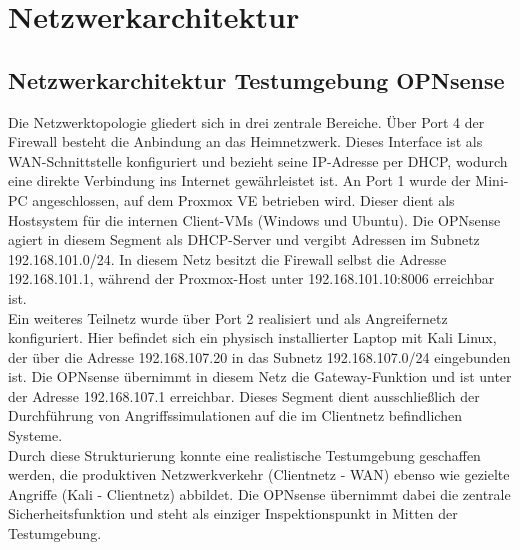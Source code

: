 \section{Netzwerkarchitektur}
\subsection{Netzwerkarchitektur Testumgebung OPNsense}
Die Netzwerktopologie gliedert sich in drei zentrale Bereiche. Über Port 4 der Firewall besteht die Anbindung an das Heimnetzwerk. Dieses Interface ist als WAN-Schnittstelle konfiguriert und bezieht seine IP-Adresse per DHCP, wodurch eine direkte Verbindung ins Internet gewährleistet ist. An Port 1 wurde der Mini-PC angeschlossen, auf dem Proxmox VE betrieben wird. Dieser dient als Hostsystem für die internen Client-VMs (Windows und Ubuntu). Die OPNsense agiert in diesem Segment als DHCP-Server und vergibt Adressen im Subnetz 192.168.101.0/24. In diesem Netz besitzt die Firewall selbst die Adresse 192.168.101.1, während der Proxmox-Host unter 192.168.101.10:8006 erreichbar ist.\\
Ein weiteres Teilnetz wurde über Port 2 realisiert und als Angreifernetz konfiguriert. Hier befindet sich ein physisch installierter Laptop mit Kali Linux, der über die Adresse 192.168.107.20 in das Subnetz 192.168.107.0/24 eingebunden ist. Die OPNsense übernimmt in diesem Netz die Gateway-Funktion und ist unter der Adresse 192.168.107.1 erreichbar. Dieses Segment dient ausschließlich der Durchführung von Angriffssimulationen auf die im Clientnetz befindlichen Systeme.\\
Durch diese Strukturierung konnte eine realistische Testumgebung geschaffen werden, die produktiven Netzwerkverkehr (Clientnetz - WAN) ebenso wie gezielte Angriffe (Kali - Clientnetz) abbildet. Die OPNsense übernimmt dabei die zentrale Sicherheitsfunktion und steht als einziger Inspektionspunkt in Mitten der Testumgebung.

